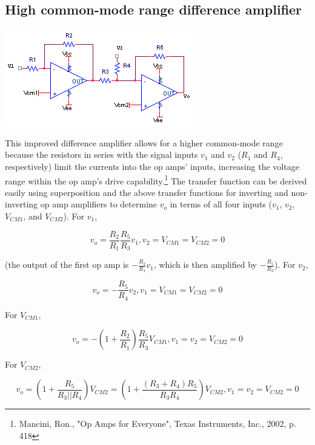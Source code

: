 \subsection{High common-mode range difference amplifier}
\begin{center}
	\includegraphics{schematics/highcmdifferenceamplifier.PNG}
\end{center}
This improved difference amplifier allows for a higher common-mode range because the resistors in series with the signal inputs $v_{1}$ and $v_{2}$ ($R_{1}$ and $R_{4}$, respectively) limit the currents into the op amps' inputs, increasing the voltage range within the op amp's drive capability.\footnote{Mancini, Ron., "Op Amps for Everyone", Texas Instruments, Inc., 2002, p. 418} The transfer function can be derived easily using superposition and the above transfer functions for inverting and non-inverting op amp amplifiers to determine $v_{o}$ in terms of all four inputs ($v_{1}$, $v_{2}$, $V_{CM1}$, and $V_{CM2}$). For $v_{1}$,

\begin{equation}
v_{o} = \frac{R_{2}}{R_{1}}\frac{R_{5}}{R_{3}}v_{1}, v_{2} = V_{CM1} = V_{CM2} = 0
\end{equation}

\noindent (the output of the first op amp is $-\frac{R_{2}}{R_{1}}v_{1}$, which is then amplified by $-\frac{R_{5}}{R_{3}}$). For $v_{2}$,

\begin{equation}
v_{o} = -\frac{R_{5}}{R_{4}}v_{2}, v_{1} = V_{CM1} = V_{CM2} = 0
\end{equation}

\noindent For $V_{CM1}$,

\begin{equation}
v_{o} = -(1+\frac{R_{2}}{R_{1}})\frac{R_{5}}{R_{3}}V_{CM1}, v_{1} = v_{2} = V_{CM2} = 0
\end{equation}

\noindent For $V_{CM2}$,

\begin{equation}
v_{o} = (1+\frac{R_{5}}{R_{3}||R_{4}})V_{CM2} = (1+\frac{(R_{3}+R_{4})R_{5}}{R_{3}R_{4}})V_{CM2}, v_{1} = v_{2} = V_{CM2} = 0
\end{equation}

